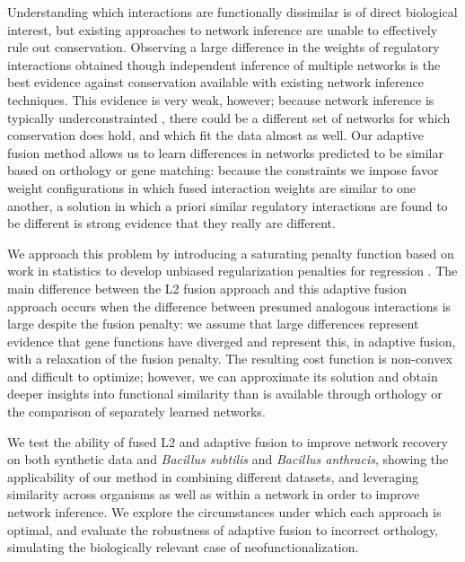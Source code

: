 \documentclass[11pt]{article}
\begin{document}
Understanding which interactions are functionally dissimilar is of direct biological interest, but existing approaches to network inference are unable to effectively rule out conservation. Observing a large difference in the weights of regulatory interactions obtained though independent inference of multiple networks is the best evidence against conservation available with existing network inference techniques. This evidence is very weak, however; because network inference is typically underconstrainted \cite{marbach_revealing_2010-1}, there could be a different set of networks for which conservation does hold, and which fit the data almost as well. Our adaptive fusion method allows us to learn differences in networks predicted to be similar based on orthology or gene matching: because the constraints we impose favor weight configurations in which fused interaction weights are similar to one another, a solution in which a priori similar regulatory interactions are found to be different is strong evidence that they really are different. 

We approach this problem by introducing a saturating penalty function based on work in statistics to develop unbiased regularization penalties for regression \cite{zhang2010nearly, fan2001variable}. The main difference between the L2 fusion approach and this adaptive fusion approach occurs when the difference between presumed analogous interactions is large despite the fusion penalty: we assume that large differences represent evidence that gene functions have diverged and represent this, in adaptive fusion, with a relaxation of the fusion penalty. The resulting cost function is non-convex and difficult to optimize; however, we can approximate its solution and obtain deeper insights into functional similarity than is available through orthology or the comparison of separately learned networks. 

We test the ability of fused L2 and adaptive fusion to improve network recovery on both synthetic data and \textit{Bacillus subtilis} and \textit{Bacillus anthracis}, showing the applicability of our method in combining different datasets, and leveraging similarity across organisms as well as within a network in order to improve network inference. We explore the circumstances under which each approach is optimal, and evaluate the robustness of adaptive fusion to incorrect orthology, simulating the biologically relevant case of neofunctionalization. 
\end{document}
